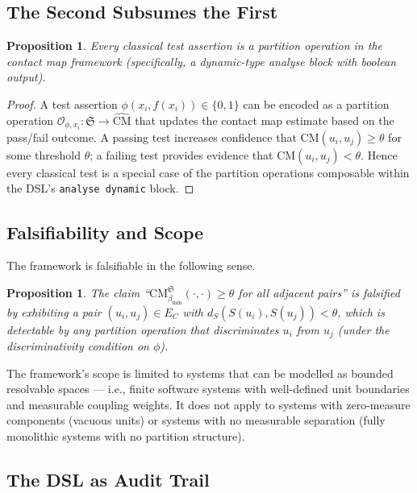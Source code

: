 \documentclass[12pt,a4paper,twocolumn]{article}
\theoremstyle{plain}
\newtheorem{proposition}[theorem]{Proposition}
\theoremstyle{definition}
\theoremstyle{remark}
\newcommand{\CM}{\mathrm{CM}}
\newcommand{\bmin}{\beta_{\min}}
\newcommand{\dS}{d_S}
\newcommand{\CMbmin}{\CM_{\bmin}}
\begin{document}
\subsection{The Second Subsumes the First}

\begin{proposition}
Every classical test assertion is a partition operation in the contact map
framework (specifically, a dynamic-type analyse block with boolean output).
\end{proposition}

\begin{proof}
A test assertion $\phi(x_i, f(x_i)) \in \{0,1\}$ can be encoded as a
partition operation $\mathcal{O}_{\phi,x_i} : \mathfrak{S} \to \hat{\CM}$
that updates the contact map estimate based on the pass/fail outcome.  A
passing test increases confidence that $\CM(u_i, u_j) \geq \theta$ for some
threshold $\theta$; a failing test provides evidence that $\CM(u_i, u_j) <
\theta$.  Hence every classical test is a special case of the partition
operations composable within the DSL's \texttt{analyse dynamic} block.
\end{proof}

\subsection{Falsifiability and Scope}

The framework is falsifiable in the following sense.

\begin{proposition}
The claim ``$\CMbmin^\mathfrak{S}(\cdot, \cdot) \geq \theta$ for all adjacent
pairs'' is falsified by exhibiting a pair $(u_i, u_j) \in E_C$ with
$\dS(S(u_i), S(u_j)) < \theta$, which is detectable by any partition
operation that discriminates $u_i$ from $u_j$ (under the discriminativity
condition on $\phi$).
\end{proposition}

The framework's scope is limited to systems that can be modelled as bounded
resolvable spaces --- i.e., finite software systems with well-defined unit
boundaries and measurable coupling weights.  It does not apply to systems
with zero-measure components (vacuous units) or systems with no measurable
separation (fully monolithic systems with no partition structure).

\subsection{The DSL as Audit Trail}
\end{document}
